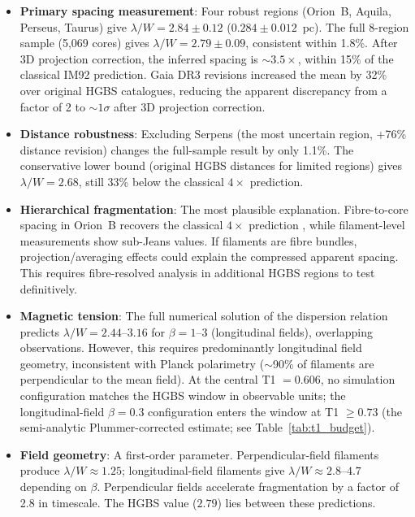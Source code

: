 \documentclass[twoside,twocolumn]{mnras}
\begin{document}
\begin{itemize}

    \item \textbf{Primary spacing measurement}: Four robust regions (Orion~B, Aquila,
    Perseus, Taurus) give $\lambda/W = 2.84 \pm 0.12$ ($0.284 \pm 0.012$~pc). The
    full 8-region sample (5,069 cores) gives $\lambda/W = 2.79 \pm 0.09$, consistent
    within 1.8\%. After 3D projection correction, the inferred spacing is ${\sim}3.5\times$,
    within 15\% of the classical IM92 prediction. Gaia DR3 revisions increased the mean
    by 32\% over original HGBS catalogues, reducing the apparent discrepancy from a factor of 2 to ${\sim}1\sigma$ after 3D projection correction.

    \item \textbf{Distance robustness}: Excluding Serpens (the most uncertain region,
    +76\% distance revision) changes the full-sample result by only 1.1\%.
    The conservative lower bound (original HGBS distances for limited regions) gives
    $\lambda/W = 2.68$, still 33\% below the classical $4\times$ prediction.

    \item \textbf{Hierarchical fragmentation}: The most plausible explanation.
    Fibre-to-core spacing in Orion~B recovers the classical $4\times$ prediction
    \citep{Yang2024}, while filament-level measurements show sub-Jeans values.
    If filaments are fibre bundles, projection/averaging effects could explain the
    compressed apparent spacing. This requires fibre-resolved analysis in additional
    HGBS regions to test definitively.

    \item \textbf{Magnetic tension}: The full numerical solution of the dispersion
    relation predicts $\lambda/W = 2.44$--$3.16$ for $\beta = 1$--$3$ (longitudinal
    fields), overlapping observations. However, this requires predominantly longitudinal
    field geometry, inconsistent with Planck polarimetry ($\sim$90\% of filaments
    are perpendicular to the mean field). At the central T1 $= 0.606$, no simulation
    configuration matches the HGBS window in observable units; the longitudinal-field
    $\beta = 0.3$ configuration enters the window at T1 $\geq 0.73$ (the semi-analytic Plummer-corrected estimate; see Table~\ref{tab:t1_budget}).

    \item \textbf{Field geometry}: A first-order parameter. Perpendicular-field
    filaments produce $\lambda/W \approx 1.25$; longitudinal-field filaments give
    $\lambda/W \approx 2.8$--$4.7$ depending on $\beta$. Perpendicular fields accelerate
    fragmentation by a factor of 2.8 in timescale. The HGBS value ($2.79$) lies between
    these predictions.


\end{itemize}
\end{document}
